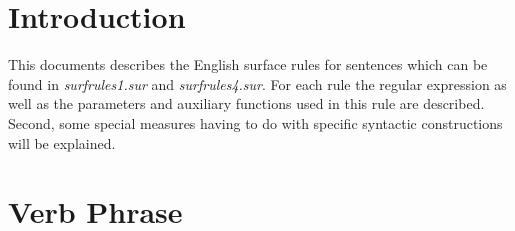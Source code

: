 

   \RosDate{\today}
   \RosSupersedes{-}
   \MakeRosTitle
%
%
\section{Introduction}
This documents describes the English surface rules for sentences which can be 
found in {\em surfrules1.sur} and {\em surfrules4.sur}. 
For each rule the regular 
expression as 
well as the parameters and auxiliary functions used in this rule are 
described. Second, some special measures having to do with specific syntactic 
constructions will be explained.\\
\section{Verb Phrase}
